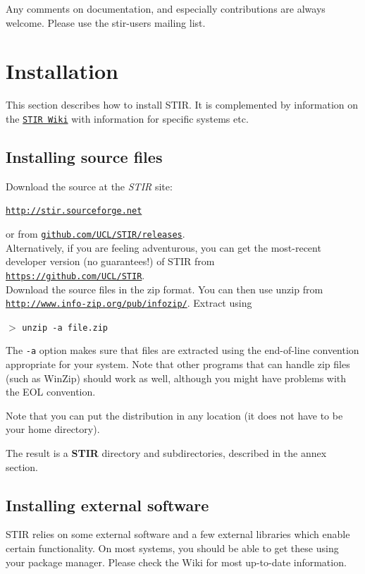 \documentclass{article}
\def\url#1#2{\mbox{\href{#1}{\tt #2}}}
\newcommand{\cmdline}[1]{\par \noindent $>$ \texttt{#1}\par}
\begin{document}
Any comments on documentation, and especially contributions are 
always welcome. Please use the stir-users mailing list.

\section{
Installation}
This section describes how to install STIR. It is complemented by information on the
\url{http://stir.sourceforge.net/wiki}{STIR Wiki} with information for specific systems etc.

\subsection{
Installing source files}

Download the source at the \textit{STIR} site: 
\begin{center}
\url{http://stir.sourceforge.net }{http://stir.sourceforge.net} 
\end{center}
or from \url{https://github.com/UCL/STIR/releases}{github.com/UCL/STIR/releases}.\\
Alternatively, if you are feeling adventurous, you can get the most-recent
developer version (no guarantees!) of STIR from\\
\url{https://github.com/UCL/STIR}{https://github.com/UCL/STIR}.\\
Download the source files in the zip format. You can then use unzip from \\
\url{http://www.info-zip.org/pub/infozip/}{http://www.info-zip.org/pub/infozip/}. 
Extract using
\cmdline{unzip -a file.zip}


The \texttt{-a} option makes sure that files are extracted using the 
end-of-line convention appropriate for your system. Note that 
other programs that can handle zip files (such as WinZip) should 
work as well, although you might have problems with the EOL convention.


Note that you can put the distribution in any location (it does 
not have to be your home directory).


The result is a \textbf{STIR} directory and subdirectories, described 
in the annex section.

\subsection{
Installing external software}
STIR relies on some external software and a few external libraries which enable certain functionality. 
On most systems, you should be able to get these using your package manager. 
Please check the Wiki for most up-to-date information.
\end{document}
